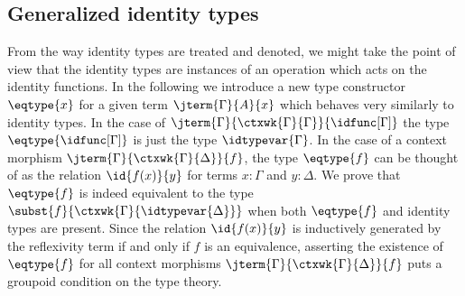 \begin{comment}
\begin{proof}
By the identity elimination rule it suffices to find a term
\begin{equation*}
\jterm
  {\ctxext{{\Gamma}{A}}{\ctxwk{A}{B}}}
  {\subst{\refl{\ctxwk{A}{B}}}{{\idfunc[\ctxwk{A}{B}]}{\ctxwk{\idtypevar{\ctxwk{A}{B}}}{\ctxwk{A}{\idtypevar{B}}}}}}
  {i}
\end{equation*}
We may simplify the type $\subst{\refl{\ctxwk{A}{B}}}{{\idfunc[\ctxwk{A}{B}]}{\ctxwk{\idtypevar{\ctxwk{A}{B}}}{\ctxwk{A}{\idtypevar{B}}}}}$ as follows:
\begin{align*}
& \subst{\refl{\ctxwk{A}{B}}}{{\idfunc[\ctxwk{A}{B}]}{\ctxwk{\idtypevar{\ctxwk{A}{B}}}{\ctxwk{A}{\idtypevar{B}}}}}\\
& \qquad\jdeq \subst{\idfunc[\ctxwk{A}{B}]}{{\ctxwk{..}{\refl{\ctxwk{A}{B}}}}{\ctxwk{\idtypevar{\ctxwk{A}{B}}}{\ctxwk{A}{\idtypevar{B}}}}}
\end{align*}
\end{proof}

\subsubsection{Compatibility of identity types with substitution}
\end{comment}

\subsection{Generalized identity types}
From the way identity types are treated and denoted, we might take the point of
view that the identity types are instances of an operation which acts on the
identity functions. In the following we introduce a new type constructor
$\eqtype{x}$ for a given term $\jterm{\Gamma}{A}{x}$ which behaves very similarly
to identity types. In the case of $\jterm{\Gamma}{\ctxwk{\Gamma}{\Gamma}}{\idfunc[\Gamma]}$
the type $\eqtype{\idfunc[\Gamma]}$ is just the type $\idtypevar{\Gamma}$. In
the case of a context morphism $\jterm{\Gamma}{\ctxwk{\Gamma}{\Delta}}{f}$, the
type $\eqtype{f}$ can be thought of as the relation $\id{f(x)}{y}$ for terms $x:\Gamma$
and $y:\Delta$. We prove that $\eqtype{f}$ is indeed equivalent to the type
$\subst{f}{\ctxwk{\Gamma}{\idtypevar{\Delta}}}$ when both $\eqtype{f}$ and identity
types are present. Since the relation $\id{f(x)}{y}$ is inductively generated
by the reflexivity term if and only if $f$ is an equivalence, asserting the existence
of $\eqtype{f}$ for all context morphisms $\jterm{\Gamma}{\ctxwk{\Gamma}{\Delta}}{f}$
puts a groupoid condition on the type theory.

